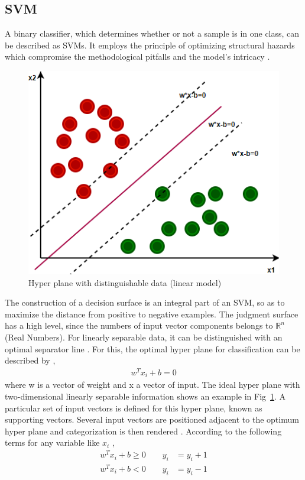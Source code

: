\documentclass[conference]{IEEEtran}
\begin{document}
\subsection{SVM}\label{AA}
A binary classifier, which determines whether or not a sample is in one class, can be described as SVMs. It employs the principle of optimizing structural hazards which compromise the methodological pitfalls and the model's intricacy \cite{10.1023/A:1009715923555}.
\begin{figure}[h!]
\centerline{\includegraphics[scale=0.5]{Capturexx (2).PNG}}
  \caption{ Hyper plane with distinguishable data (linear model)}
  \label{fig:graph}
\end{figure}
The construction of a decision surface is an integral part of an SVM, so as to maximize the
distance from positive to negative examples. The judgment surface has a high level, since the numbers of input vector components belongs to $\mathbb{R}^{n}$ (Real Numbers). For linearly separable data, it can be distinguished with an optimal separator line \cite{10.1023/A:1009715923555}. For this, the optimal hyper plane for classification can be described
by \cite{10.1023/A:1009715923555},
\begin{align}
 w^Tx_i+b = 0 
\end{align}
where w is a vector of weight and x a vector of input. The ideal hyper plane with two-dimensional linearly separable information shows an example in Fig~\ref{fig:graph}. A particular set of input vectors is defined for this hyper plane,  known  as  supporting  vectors.  Several input vectors are positioned adjacent to the optimum hyper plane and categorization is then rendered \cite{HsuLibsvmTutorial2003}. According to the following terms for any variable like $x_i$ \cite{HsuLibsvmTutorial2003},
\begin{align}
 w^Tx_i+b \geq 0 \quad \quad   y_i&=y_i+1 \\
 w^Tx_i+b < 0 \quad \quad  y_i&=y_i-1
\end{align}
\
\end{document}
